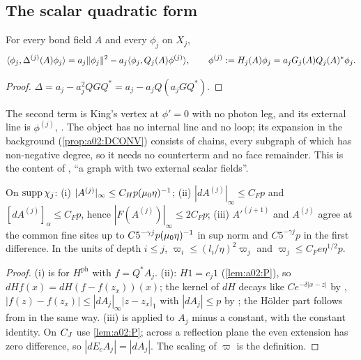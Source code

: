 \subsection{The scalar quadratic form}\label{ssec:a02:B2}

\begin{lemma}\label{lem:a02:Q2}
For every bond field $A$ and every $\phi_j$ on $X_j$,
\[
\langle \phi_j,\Delta^{(j)}(A)\phi_j\rangle=a_j\lVert \phi_j\rVert^2-a_j\langle \phi_j,Q_j(A)\phi^{(j)}\rangle,\qquad \phi^{(j)}:= H_j(A)\phi_j=a_jG_j(A)Q_j(A)^*\phi_j .
\]
\end{lemma}
\begin{proof}
$\Delta=a_j-a_j^2QGQ^*=a_j-a_jQ(a_jGQ^*)$.
\end{proof}
The second term is King's vertex \cite[(3.24)$\times$(3.25)]{K1} at $\phi'=0$ with no photon leg, and its external line is $\phi^{(j)}$, \cite[(3.28)]{K1}. The object has no internal line and no loop; its expansion in the background (\cref{prop:a02:DCONV}) consists of chains, every subgraph of which has non-negative degree, so it needs no counterterm and no face remainder. This is the content of \cite[p.~669]{K1}, ``a graph with two external scalar fields''.

\begin{lemma}\label{lem:a02:FA}
On $\operatorname{supp}\chi_j$: (i) $|A^{(j)}|_\infty\le C_Hp(\mu_0\eta)^{-1}$; (ii) $|dA^{(j)}|_\infty\le C_Fp$ and $[dA^{(j)}]_\alpha\le C_Fp$, hence $|F(A^{(j)})|_\infty\le2C_Fp$; (iii) $A'^{(j+1)}$ and $A^{(j)}$ agree at the common fine sites up to $C5^{-\gamma j}p(\mu_0\eta)^{-1}$ in sup norm and $C5^{-\gamma j}p$ in the first difference. In the units of depth $i\le j$, $\varpi_i\le(l_i/\eta)^2\varpi_j$ and $\varpi_j\le C_Fe\eta^{1/2}p$.
\end{lemma}
\begin{proof}
(i) is \cite[(3.7)]{K1} for $H^{\mathrm{ph}}$ with $f=Q^*A_j$. (ii): $H1=c_j1$ (\cref{lem:a02:P}), so $dHf(x)=dH(f-f(z_x))(x)$; the kernel of $dH$ decays like $Ce^{-\delta|x-z|}$ by \cite[(3.7)]{K1}, $|f(z)-f(z_x)|\le|dA_j|_\infty|z-z_x|_1$ with $|dA_j|\le p$ by \cite[(3.2)]{K1}; the H\"older part follows from \cite[(3.8)]{K1} in the same way. (iii) is \cite[(3.71)]{K1} applied to $A_j$ minus a constant, with the constant identity. On $C_J$ use \cref{lem:a02:P}; across a reflection plane the even extension has zero difference, so $|dE_cA_j|=|dA_j|$. The scaling of $\varpi$ is the definition.
\end{proof}

